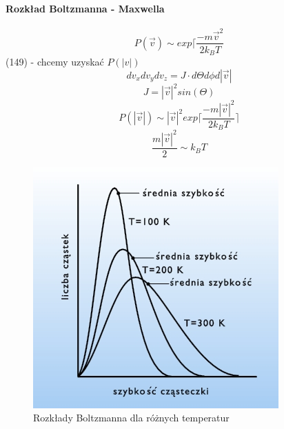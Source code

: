 \documentclass{article}
\begin{document}
		\paragraph{Rozkład Boltzmanna - Maxwella}
		\begin{equation}
		P(\vec{v}) \sim exp\lceil \frac{-m\vec{v}^2}{2k_BT}
		\end{equation}
		(149) - chcemy uzyskać $ P(|v|) $
		\begin{equation}
		dv_xdv_ydv_z = J\cdot d\Theta d\phi d|\vec{v}|
		\end{equation}
		\begin{equation}
		J = |\vec{v}|^2sin(\Theta)
		\end{equation}
		\begin{equation}
		P(|\vec{v}|) \sim |\vec{v}|^2exp\lceil \frac{-m|\vec{v}|^2}{2k_BT} \rceil
		\end{equation}
		\begin{equation}
		\frac{m|\vec{v}|^2}{2} \sim k_BT
		\end{equation}
		\begin{figure}[ht]
			\label{fig:fig1}
			\centering
			\includegraphics[scale=0.5]{boltzmann.jpg}
			\caption{Rozkłady Boltzmanna dla różnych temperatur}
		\end{figure}
		
		
		
		
		
\end{document}
